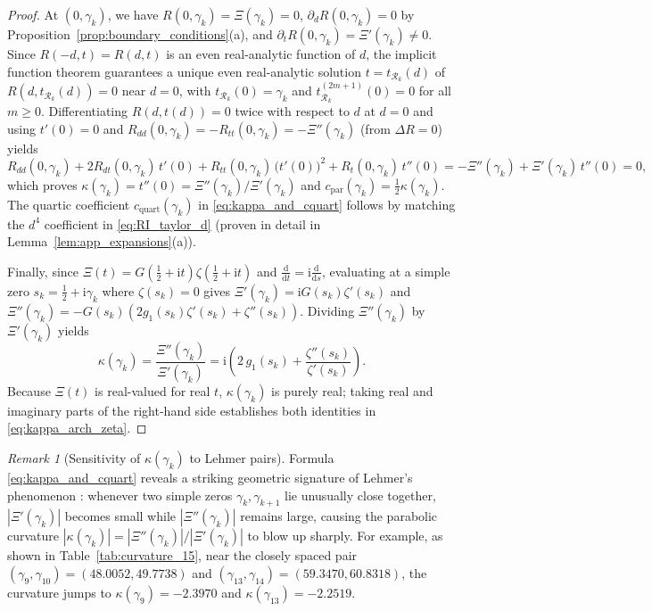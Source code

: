 \documentclass[11pt,a4paper,reqno]{amsart}
\theoremstyle{definition}
\theoremstyle{remark}
\newtheorem{remark}[theorem]{Remark}
\numberwithin{equation}{section}
\newcommand{\dd}{\mathrm{d}}
\newcommand{\ii}{\mathrm{i}}
\begin{document}
\begin{proof}
At $(0, \gamma_k)$, we have $R(0,\gamma_k) = \Xi(\gamma_k) = 0$, $\partial_d R(0,\gamma_k) = 0$ by Proposition~\ref{prop:boundary_conditions}(a), and $\partial_t R(0,\gamma_k) = \Xi'(\gamma_k) \neq 0$. Since $R(-d,t) = R(d,t)$ is an even real-analytic function of $d$, the implicit function theorem guarantees a unique even real-analytic solution $t = t_{\mathcal{R}_k}(d)$ of $R(d, t_{\mathcal{R}_k}(d)) = 0$ near $d = 0$, with $t_{\mathcal{R}_k}(0) = \gamma_k$ and $t_{\mathcal{R}_k}^{(2m+1)}(0) = 0$ for all $m \ge 0$. Differentiating $R(d, t(d)) = 0$ twice with respect to $d$ at $d = 0$ and using $t'(0) = 0$ and $R_{dd}(0,\gamma_k) = -R_{tt}(0,\gamma_k) = -\Xi''(\gamma_k)$ (from $\Delta R = 0$) yields
\[
R_{dd}(0,\gamma_k) + 2 R_{dt}(0,\gamma_k)\,t'(0) + R_{tt}(0,\gamma_k)\,\big(t'(0)\big)^2 + R_t(0,\gamma_k)\,t''(0) = -\Xi''(\gamma_k) + \Xi'(\gamma_k)\,t''(0) = 0,
\]
which proves $\kappa(\gamma_k) = t''(0) = \Xi''(\gamma_k)/\Xi'(\gamma_k)$ and $c_{\mathrm{par}}(\gamma_k) = \frac{1}{2}\kappa(\gamma_k)$. The quartic coefficient $c_{\mathrm{quart}}(\gamma_k)$ in \eqref{eq:kappa_and_cquart} follows by matching the $d^4$ coefficient in \eqref{eq:RI_taylor_d} (proven in detail in Lemma~\ref{lem:app_expansions}(a)).

Finally, since $\Xi(t) = G(\frac{1}{2}+\ii t)\zeta(\frac{1}{2}+\ii t)$ and $\frac{\dd}{\dd t} = \ii\frac{\dd}{\dd s}$, evaluating at a simple zero $s_k = \frac{1}{2}+\ii\gamma_k$ where $\zeta(s_k) = 0$ gives $\Xi'(\gamma_k) = \ii G(s_k)\zeta'(s_k)$ and $\Xi''(\gamma_k) = -G(s_k)(2g_1(s_k)\zeta'(s_k) + \zeta''(s_k))$. Dividing $\Xi''(\gamma_k)$ by $\Xi'(\gamma_k)$ yields
\[
\kappa(\gamma_k) = \frac{\Xi''(\gamma_k)}{\Xi'(\gamma_k)} = \ii\left(2\,g_1(s_k) + \frac{\zeta''(s_k)}{\zeta'(s_k)}\right).
\]
Because $\Xi(t)$ is real-valued for real $t$, $\kappa(\gamma_k)$ is purely real; taking real and imaginary parts of the right-hand side establishes both identities in \eqref{eq:kappa_arch_zeta}.
\end{proof}

\begin{remark}[Sensitivity of $\kappa(\gamma_k)$ to Lehmer pairs]\label{rem:lehmer_curvature}
Formula \eqref{eq:kappa_and_cquart} reveals a striking geometric signature of Lehmer's phenomenon \cite{Lehmer1956}: whenever two simple zeros $\gamma_k, \gamma_{k+1}$ lie unusually close together, $|\Xi'(\gamma_k)|$ becomes small while $|\Xi''(\gamma_k)|$ remains large, causing the parabolic curvature $|\kappa(\gamma_k)| = |\Xi''(\gamma_k)|/|\Xi'(\gamma_k)|$ to blow up sharply. For example, as shown in Table~\ref{tab:curvature_15}, near the closely spaced pair $(\gamma_9, \gamma_{10}) = (48.0052, 49.7738)$ and $(\gamma_{13}, \gamma_{14}) = (59.3470, 60.8318)$, the curvature jumps to $\kappa(\gamma_9) = -2.3970$ and $\kappa(\gamma_{13}) = -2.2519$.
\end{remark}
\end{document}
